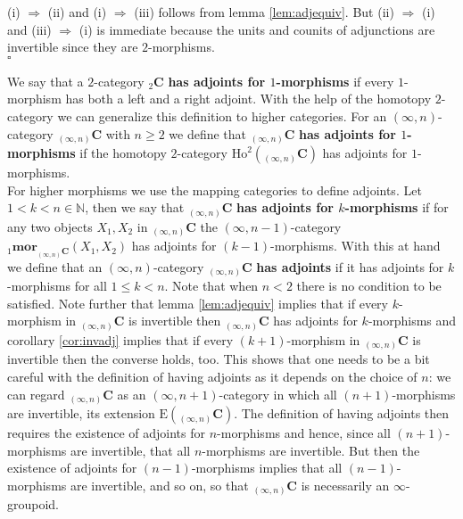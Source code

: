 \begin{prf}
(i) $\Rightarrow$ (ii) and (i) $\Rightarrow$ (iii) follows from lemma \ref{lem:adjequiv}. But (ii) $\Rightarrow$ (i) and (iii) $\Rightarrow$ (i) is immediate because the units and counits of adjunctions are invertible since they are $2$-morphisms.
\\
\phantom{proven}
\hfill
$\square$
\end{prf}
We say that a $2$-category ${_{2}}\mathbf{C}$ \textbf{has adjoints for $1$-morphisms} if every $1$-morphism has both a left and a right adjoint. With the help of the homotopy $2$-category we can generalize this definition to higher categories. For an $(\infty,n)$-category ${_{(\infty,n)}}\mathbf{C}$ with $n \geq 2$ we define that ${_{(\infty,n)}}\mathbf{C}$ \textbf{has adjoints for $1$-morphisms} if the homotopy $2$-category $\mathrm{Ho}^{2}({_{(\infty,n)}}\mathbf{C})$ has adjoints for $1$-morphisms.
\\
For higher morphisms we use the mapping categories to define adjoints. Let $1 < k < n \in \mathbb{N}$, then we say that ${_{(\infty,n)}}\mathbf{C}$ \textbf{has adjoints for $k$-morphisms} if for any two objects $X_{1},X_{2}$ in ${_{(\infty,n)}}\mathbf{C}$ the $(\infty,n-1)$-category ${_{1}}\mathbf{mor}_{{_{(\infty,n)}}\mathbf{C}}(X_{1},X_{2})$ has adjoints for $(k-1)$-morphisms. With this at hand we define that an $(\infty,n)$-category ${_{(\infty,n)}}\mathbf{C}$ \textbf{has adjoints} if it has adjoints for $k$-morphisms for all $1 \leq k < n$. Note that when $n < 2$ there is no condition to be satisfied. Note further that lemma \ref{lem:adjequiv} implies that if every $k$-morphism in ${_{(\infty,n)}}\mathbf{C}$ is invertible then ${_{(\infty,n)}}\mathbf{C}$ has adjoints for $k$-morphisms and corollary \ref{cor:invadj} implies that if every $(k+1)$-morphism in ${_{(\infty,n)}}\mathbf{C}$ is invertible then the converse holds, too. This shows that one needs to be a bit careful with the definition of having adjoints as it depends on the choice of $n$: we can regard ${_{(\infty,n)}}\mathbf{C}$ as an $(\infty,n+1)$-category in which all $(n+1)$-morphisms are invertible, its extension $\mathrm{E}({_{(\infty,n)}}\mathbf{C})$. The definition of having adjoints then requires the existence of adjoints for $n$-morphisms and hence, since all $(n+1)$-morphisms are invertible, that all $n$-morphisms are invertible. But then the existence of adjoints for $(n-1)$-morphisms implies that all $(n-1)$-morphisms are invertible, and so on, so that ${_{(\infty,n)}}\mathbf{C}$ is necessarily an $\infty$-groupoid.
\\
